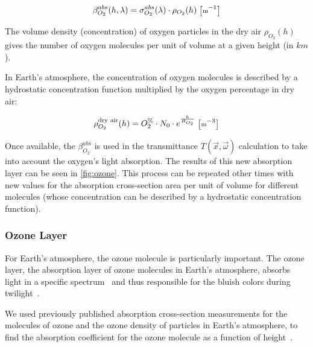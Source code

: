 \documentclass[journal]{vgtc}                %
\newcommand{\review}[1]{{\color{blue}#1}}
\begin{document}
\vspace*{-2mm}
\begin{equation} \label{eq:beta-oxygen}   
  \small
  \beta^{abs}_{O_2}(h, \lambda) = \sigma^{abs}_{O_2}(\lambda) \cdot \rho_{O_2}(h)\ \big[\text{m}^{-1}\big]
\end{equation}

The volume density (concentration) of oxygen particles in the dry air $\rho_{O_2}(h)$ gives the number of oxygen molecules per unit of volume at a given height (in $km$).

In Earth's atmosphere, the \review{concentration of oxygen molecules} is described by a hydrostatic concentration function multiplied by the oxygen percentage in dry air:

\vspace*{-2.5mm}
\begin{equation} \label{eq:oxygen-density}
  \small
  \rho^{\text{dry air}}_{O_2}(h) = O_2^{\%}\cdot N_0 \cdot e^{\frac{h}{H_{O_2}}}\ \big[\text{m}^{-3}\big]
\end{equation}

Once available, the $\beta^{abs}_{O_2}$ is used in the transmittance $T(\vec{x}, \vec{\omega})$ calculation to take into account the oxygen's light absorption. The results of this new absorption layer can be seen in \autoref{fig:ozone}. This process can be repeated other times with new values for the absorption cross-section area per unit of volume for different molecules (whose concentration can be described by a hydrostatic concentration function).

\vspace*{-2mm}
\subsubsection{Ozone Layer}\label{section:Ozone}

For Earth's atmosphere, the ozone molecule is particularly important. The ozone layer, the absorption layer of ozone molecules in Earth's atmosphere, absorbs light \review{in} a specific spectrum~\cite{Horshelev:2014, Serdyuchenko:2014} and \review{thus} responsible for the bluish colors during twilight~\cite{Adams:1974}.

We used previously published absorption cross-section measurements for the molecules of ozone and the ozone density of particles in Earth's atmosphere, to find the absorption coefficient for the ozone molecule as a function of height~\cite{Keller:2013, Hannelore:2013}.
\end{document}
